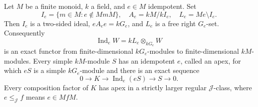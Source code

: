 \begin{lemma}\label{A:apex}
Let $M$ be a finite monoid, $k$ a field, and $e\in M$ idempotent. Set
\[
 I_e=\{m\in M:e\notin MmM\},\quad
 A_e=kM/kI_e,\quad L_e=Me\setminus I_e.
\]
Then $I_e$ is a two-sided ideal, $eA_ee=kG_e$, and $L_e$ is a free right
$G_e$-set. Consequently
\[
 \operatorname{Ind}_e W=kL_e\otimes_{kG_e}W
\]
is an exact functor from finite-dimensional $kG_e$-modules to
finite-dimensional $kM$-modules. Every simple $kM$-module $S$ has an
idempotent $e$, called an apex, for which $eS$ is a simple $kG_e$-module
and there is an exact sequence
\[
 0\longrightarrow K\longrightarrow\operatorname{Ind}_e(eS)
   \longrightarrow S\longrightarrow0.                 \tag{A.1}
\]
Every composition factor of $K$ has apex in a strictly larger regular
$\mathcal J$-class, where $e\leq_{\mathcal J}f$ means $e\in MfM$.
\end{lemma}
